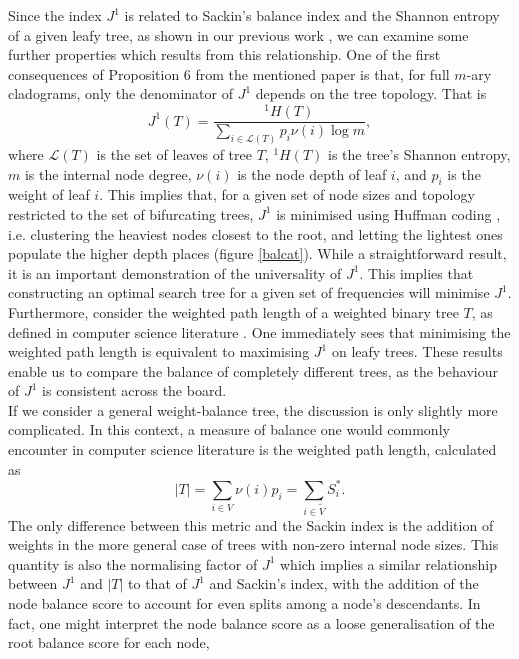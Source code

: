 \iffalse
Since the index $J^1$ is related to Sackin's balance index and the Shannon entropy of a given leafy tree, as shown in our previous work \cite{lemant_robust_2021}, we can examine some further properties which results from this relationship. One of the first consequences of Proposition $6$ from the mentioned paper is that, for full $m$-ary cladograms, only the denominator of $J^1$ depends on the tree topology. That is
\begin{equation}
    J^1(T) = \frac{^1H(T)}{\sum_{i\in\mathcal{L}(T)}p_i\nu(i)\log m}, \label{prop6}
\end{equation}
where $\mathcal{L}(T)$ is the set of leaves of tree $T$, $^1H(T)$ is the tree's Shannon entropy, $m$ is the internal node degree, $\nu(i)$ is the node depth of leaf $i$, and $p_i$ is the weight of leaf $i$. This implies that, for a given set of node sizes and topology restricted to the set of bifurcating trees, $J^1$ is minimised using Huffman coding \cite{huffman_method_nodate}, i.e. clustering the heaviest nodes closest to the root, and letting the lightest ones populate the higher depth places (figure \ref{balcat}). While a straightforward result, it is an important demonstration of the universality of $J^1$. This implies that constructing an optimal search tree for a given set of frequencies will minimise $J^1$. Furthermore, consider the weighted path length of a weighted binary tree $T$, as defined in computer science literature \cite{nievergelt_binary_nodate}. One immediately sees that minimising the weighted path length is equivalent to maximising $J^1$ on leafy trees. These results enable us to compare the balance of completely different trees, as the behaviour of $J^1$ is consistent across the board. \\
If we consider a general weight-balance tree, the discussion is only slightly more complicated. In this context, a measure of balance one would commonly encounter in computer science literature is the weighted path length, calculated as
\begin{equation}\label{weightedPL}
    |T| = \sum_{i\in V} \nu(i) p_i = \sum_{i\in\tilde{V}}S_i^*.
\end{equation}
The only difference between this metric and the Sackin index is the addition of weights in the more general case of trees with non-zero internal node sizes. This quantity is also the normalising factor of $J^1$ which implies a similar relationship between $J^1$ and $|T|$ to that of $J^1$ and Sackin's index, with the addition of the node balance score to account for even splits among a node's descendants. In fact, one might interpret the node balance score as a loose generalisation of the root balance score for each node,
